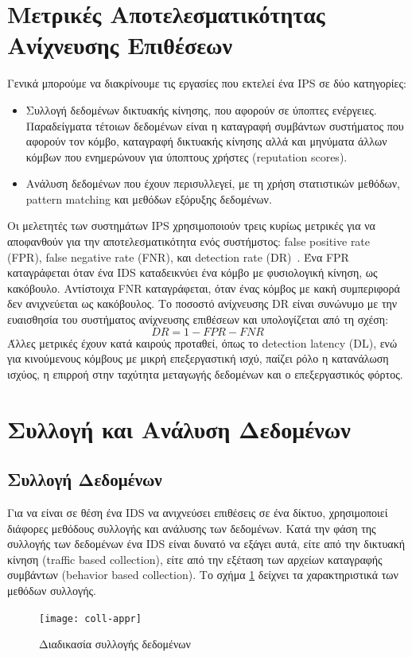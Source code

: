 \documentclass[12pt]{report}
\begin{document}
\section{Μετρικές Αποτελεσματικότητας Ανίχνευσης Επιθέσεων}
Γενικά μπορούμε να διακρίνουμε τις εργασίες που εκτελεί ένα \textlatin{IPS} σε δύο κατηγορίες:
\begin{itemize}
  \item Συλλογή δεδομένων δικτυακής κίνησης, που αφορούν σε ύποπτες ενέργειες. Παραδείγματα τέτοιων δεδομένων είναι η καταγραφή συμβάντων συστήματος που αφορούν τον κόμβο, καταγραφή δικτυακής κίνησης αλλά και μηνύματα άλλων κόμβων που ενημερώνουν για ύποπτους χρήστες (\textlatin{reputation scores}).
  \item Ανάλυση δεδομένων που έχουν περισυλλεγεί, με τη χρήση στατιστικών μεθόδων, \textlatin{pattern matching} και μεθόδων εξόρυξης δεδομένων.
\end{itemize}

Οι μελετητές των συστημάτων \textlatin{IPS} χρησιμοποιούν τρεις κυρίως μετρικές για να αποφανθούν για την αποτελεσματικότητα ενός συστήμστος: \textlatin{false positive rate (FPR), false negative rate (FNR)}, και \textlatin{detection rate (DR)}~\cite{paper:12}. Ένα \textlatin{FPR} καταγράφεται όταν ένα \textlatin{IDS} καταδεικνύει ένα κόμβο με φυσιολογική κίνηση, ως κακόβουλο. Αντίστοιχα \textlatin{FNR} καταγράφεται, όταν ένας κόμβος με κακή συμπεριφορά δεν ανιχνεύεται ως κακόβουλος. Το ποσοστό ανίχνευσης \textlatin{DR} είναι συνώνυμο με την ευαισθησία του συστήματος ανίχνευσης επιθέσεων και υπολογίζεται από τη σχέση:
\[ DR = 1 - FPR - FNR \]
Άλλες μετρικές έχουν κατά καιρούς προταθεί, όπως το \textlatin{detection latency (DL)}, ενώ για κινούμενους κόμβους με μικρή επεξεργαστική ισχύ, παίζει ρόλο η κατανάλωση ισχύος, η επιρροή στην ταχύτητα μεταγωγής δεδομένων και ο επεξεργαστικός φόρτος.

\section{Συλλογή και Ανάλυση Δεδομένων}
\subsection{Συλλογή Δεδομένων}
Για να είναι σε θέση ένα \textlatin{IDS} να ανιχνεύσει επιθέσεις σε ένα δίκτυο, χρησιμοποιεί διάφορες μεθόδους συλλογής και ανάλυσης των δεδομένων. Κατά την φάση της συλλογής των δεδομένων ένα \textlatin{IDS} είναι δυνατό να εξάγει αυτά, είτε από την δικτυακή κίνηση (\textlatin{traffic based collection}), είτε από την εξέταση των αρχείων καταγραφής συμβάντων (\textlatin{behavior based collection}). Το σχήμα \ref{fig:coll-appr} δείχνει τα χαρακτηριστικά των μεθόδων συλλογής.
\begin{figure}[ht]
\centering
\texttt{[image: coll-appr]}
\caption{Διαδικασία συλλογής δεδομένων}
\label{fig:coll-appr}
\end{figure}
\end{document}
